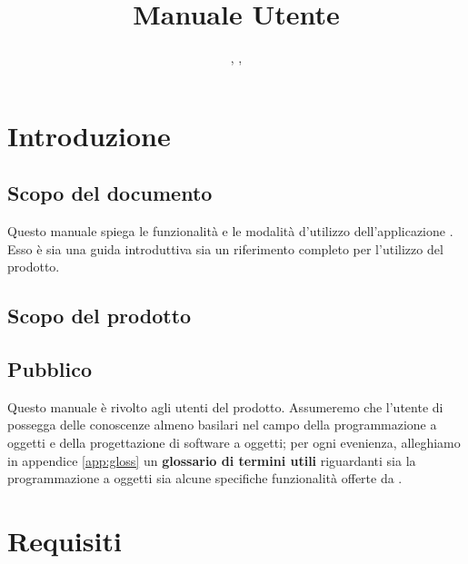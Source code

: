 


\author{\LB, \GG, \AZ}
\supervisor{\PB}
\title{Manuale Utente}


\maketitle

\tableofcontents

\renewcommand{\gloss}[1]{#1}






\section{Introduzione}

\subsection{Scopo del documento}
Questo manuale spiega le funzionalità e le modalità d'utilizzo dell'applicazione \proj. Esso è sia una guida introduttiva sia un riferimento completo per l'utilizzo del prodotto.

\subsection{Scopo del prodotto}
\scopo

\subsection{Pubblico}
Questo manuale è rivolto agli utenti del prodotto. Assumeremo che l'utente di \proj{} possegga delle conoscenze almeno basilari nel campo della programmazione a oggetti e della progettazione di software a oggetti; per ogni evenienza, alleghiamo in appendice \ref{app:gloss} un \textbf{glossario di termini utili} riguardanti sia la programmazione a oggetti sia alcune specifiche funzionalità offerte da \proj.






\section{Requisiti} \label{sec:requisiti}

